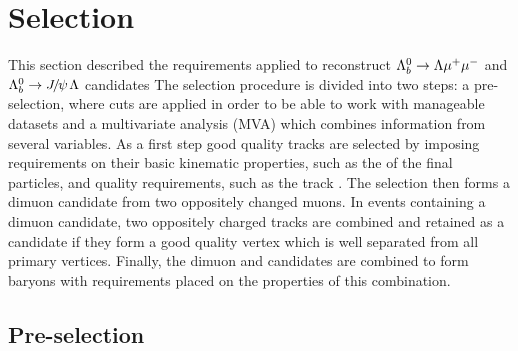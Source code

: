 \section{Selection}
\label{sec:Lb_selection}

This section described the requirements applied to reconstruct ${{\Lambda}^0_{b}}\rightarrow{\ensuremath{\Lambda}}{\ensuremath{\mu^+\mu^-}}$ and $\Lb\to\jpsi\Lz$ candidates 
The selection procedure is divided into two steps: a pre-selection, where cuts are applied in order to be able to work
with manageable datasets and a multivariate analysis (MVA) which combines information from several variables.
As a first step good quality tracks are selected by imposing requirements on their basic kinematic properties, 
such as the \pt of the final particles, and quality requirements, such as the track \chisq.
The selection then forms a dimuon candidate from two oppositely changed muons. 
In events containing a dimuon candidate, two oppositely charged tracks are combined
and retained as a \Lz candidate if they form a good quality vertex which is well separated
from all primary vertices. Finally, the dimuon and \Lz candidates are combined to form \Lb
baryons with requirements placed on the properties of this combination. 


\subsection{Pre-selection}
\label{sec:Lb_stripping}

